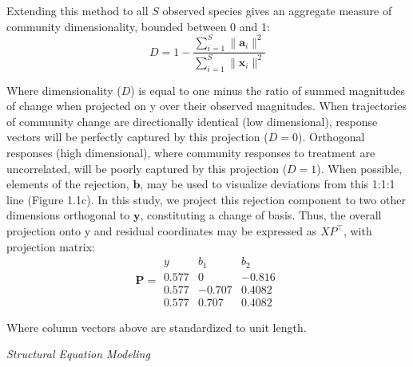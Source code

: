 \documentclass[twoside,12pt,final]{ucthesis-CA2012}
\begin{document}
\begin{ucmainmatter}
Extending this method to all \(S\) observed species gives an aggregate measure of community dimensionality, bounded between 0 and 1:
\[D = 1 - \frac{\sum_{i = 1}^{S}\|\mathbf{a}_i\|^2}{\sum_{i = 1}^{S}\|\mathbf{x}_i\|^2}\]

Where dimensionality (\(D\)) is equal to one minus the ratio of summed magnitudes of change when projected on y over their observed magnitudes. When trajectories of community change are directionally identical (low dimensional), response vectors will be perfectly captured by this projection (\(D = 0\)). Orthogonal responses (high dimensional), where community responses to treatment are uncorrelated, will be poorly captured by this projection (\(D = 1\)).
When possible, elements of the rejection, \(\mathbf{b}\), may be used to visualize deviations from this 1:1:1 line (Figure 1.1c). In this study, we project this rejection component to two other dimensions orthogonal to \(\mathbf{y}\), constituting a change of basis. Thus, the overall projection onto y and residual coordinates may be expressed as \(XP^\top\), with projection matrix:
\[
\mathbf{P} = 
\begin{matrix}
y & b_1 & b_2 \\
\hline
0.577 & 0 & -0.816 \\
0.577 & -0.707 & 0.4082 \\
0.577 & 0.707 & 0.4082 
\end{matrix}
\]

Where column vectors above are standardized to unit length.

\emph{Structural Equation Modeling}


\end{ucmainmatter}
\end{document}
